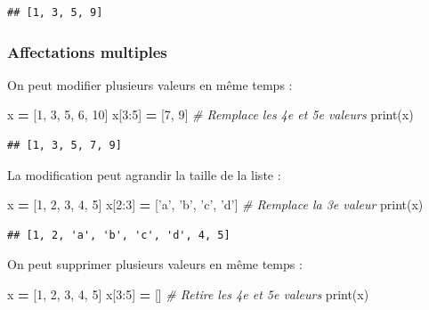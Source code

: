\documentclass[12pt,]{book}
\newenvironment{Shaded}{\begin{snugshade}}{\end{snugshade}}
\newcommand{\DecValTok}[1]{\textcolor[rgb]{0.00,0.00,0.81}{#1}}
\newcommand{\StringTok}[1]{\textcolor[rgb]{0.31,0.60,0.02}{#1}}
\newcommand{\CommentTok}[1]{\textcolor[rgb]{0.56,0.35,0.01}{\textit{#1}}}
\newcommand{\OperatorTok}[1]{\textcolor[rgb]{0.81,0.36,0.00}{\textbf{#1}}}
\newcommand{\BuiltInTok}[1]{#1}
\newcommand{\NormalTok}[1]{#1}
\numberwithin{equation}{section}
\numberwithin{countremarque}{section}
\begin{document}
\begin{lstlisting}
## [1, 3, 5, 9]
\end{lstlisting}

\subsubsection{Affectations multiples}\label{affectations-multiples}

On peut modifier plusieurs valeurs en même temps :

\begin{Shaded}
\begin{Highlighting}[]
\NormalTok{x }\OperatorTok{=}\NormalTok{ [}\DecValTok{1}\NormalTok{, }\DecValTok{3}\NormalTok{, }\DecValTok{5}\NormalTok{, }\DecValTok{6}\NormalTok{, }\DecValTok{10}\NormalTok{]}
\NormalTok{x[}\DecValTok{3}\NormalTok{:}\DecValTok{5}\NormalTok{] }\OperatorTok{=}\NormalTok{ [}\DecValTok{7}\NormalTok{, }\DecValTok{9}\NormalTok{] }\CommentTok{# Remplace les 4e et 5e valeurs}
\BuiltInTok{print}\NormalTok{(x)}
\end{Highlighting}
\end{Shaded}

\begin{lstlisting}
## [1, 3, 5, 7, 9]
\end{lstlisting}

La modification peut agrandir la taille de la liste :

\begin{Shaded}
\begin{Highlighting}[]
\NormalTok{x }\OperatorTok{=}\NormalTok{ [}\DecValTok{1}\NormalTok{, }\DecValTok{2}\NormalTok{, }\DecValTok{3}\NormalTok{, }\DecValTok{4}\NormalTok{, }\DecValTok{5}\NormalTok{]}
\NormalTok{x[}\DecValTok{2}\NormalTok{:}\DecValTok{3}\NormalTok{] }\OperatorTok{=}\NormalTok{ [}\StringTok{'a'}\NormalTok{, }\StringTok{'b'}\NormalTok{, }\StringTok{'c'}\NormalTok{, }\StringTok{'d'}\NormalTok{] }\CommentTok{# Remplace la 3e valeur}
\BuiltInTok{print}\NormalTok{(x)}
\end{Highlighting}
\end{Shaded}

\begin{lstlisting}
## [1, 2, 'a', 'b', 'c', 'd', 4, 5]
\end{lstlisting}

On peut supprimer plusieurs valeurs en même temps :

\begin{Shaded}
\begin{Highlighting}[]
\NormalTok{x }\OperatorTok{=}\NormalTok{ [}\DecValTok{1}\NormalTok{, }\DecValTok{2}\NormalTok{, }\DecValTok{3}\NormalTok{, }\DecValTok{4}\NormalTok{, }\DecValTok{5}\NormalTok{]}
\NormalTok{x[}\DecValTok{3}\NormalTok{:}\DecValTok{5}\NormalTok{] }\OperatorTok{=}\NormalTok{ [] }\CommentTok{# Retire les 4e et 5e valeurs}
\BuiltInTok{print}\NormalTok{(x)}
\end{Highlighting}
\end{Shaded}
\end{document}

